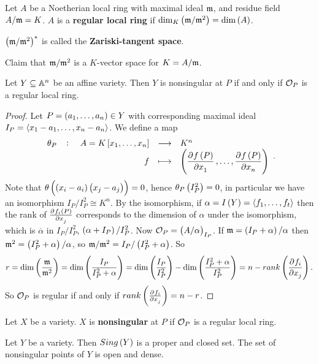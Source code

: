 \begin{definition}
Let $ A $ be a Noetherian local ring with maximal ideal $ \mathfrak{m} $, and residue field $ A / \mathfrak{m} = K $. $ A $ is a \textbf{regular local ring} if $ \dim_K\br{\mm / \mm^2} = \dim\br{A} $.
\end{definition}

\begin{note*}
$ \br{\mm / \mm^2}^* $ is called the \textbf{Zariski-tangent space}.
\end{note*}

Claim that $ \mathfrak{m} / \mathfrak{m}^2 $ is a $ K $-vector space for $ K = A / \mathfrak{m} $.

\begin{theorem}
Let $ Y \subseteq \mathbb{A}^n $ be an affine variety. Then $ Y $ is nonsingular at $ P $ if and only if $ \mathcal{O}_P $ is a regular local ring.
\end{theorem}

\begin{proof}
Let $ P = \br{a_1, \dots, a_n} \in Y $ with corresponding maximal ideal $ I_P = \left\langle x_1 - a_1, \dots, x_n - a_n \right\rangle $. We define a map
$$ \function[\theta_P]{A = K\sbr{x_1, \dots, x_n}}{K^n}{f}{\br{\dpd{f\br{P}}{x_1}, \dots, \dpd{f\br{P}}{x_n}}}. $$
Note that $ \theta\br{\br{x_i - a_i}\br{x_j - a_j}} = 0 $, hence $ \theta_P\br{I_P^2} = 0 $, in particular we have an isomorphism $ I_P / I_P^2 \cong K^n $. By the isomorphism, if $ \alpha = I\br{Y} = \abr{f_1, \dots, f_t} $ then the rank of $ \tpd{f_i\br{P}}{x_j} $ corresponds to the dimension of $ \alpha $ under the isomorphism, which is $ \overline{\alpha} $ in $ I_P / I_P^2 $, $ \br{\alpha + I_P} / I_P^2 $. Now $ \OO_P = \br{A / \alpha}_{I_P} $. If $ \mm = \br{I_P + \alpha} / \alpha $ then $ \mm^2 = \br{I_P^2 + \alpha} / \alpha $, so $ \mm / \mm^2 = I_P / \br{I_P^2 + \alpha} $. So
$$ r = \dim\br{\dfrac{\mm}{\mm^2}} = \dim\br{\dfrac{I_P}{I_P^2 + \alpha}} = \dim\br{\dfrac{I_P}{I_P^2}} - \dim\br{\dfrac{I_P^2 + \alpha}{I_P^2}} = n - rank\br{\dpd{f_i}{x_j}}. $$
So $ \mathcal{O}_P $ is regular if and only if $ rank\br{\tpd{f_i}{x_j}} = n - r $.
\end{proof}

\begin{definition}
Let $ X $ be a variety. $ X $ is \textbf{nonsingular} at $ P $ if $ \mathcal{O}_P $ is a regular local ring.
\end{definition}

\begin{theorem}
Let $ Y $ be a variety. Then $ Sing\br{Y} $ is a proper and closed set. The set of nonsingular points of $ Y $ is open and dense.
\end{theorem}

